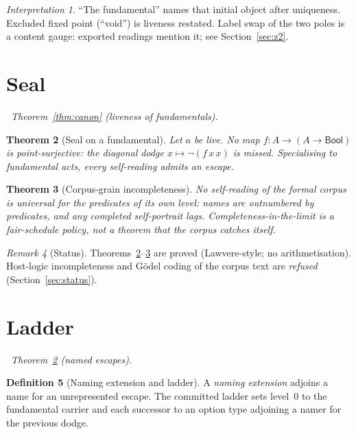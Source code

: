 \documentclass[11pt,a4paper]{article}
\theoremstyle{plain}
\newtheorem{theorem}{Theorem}[section]
\theoremstyle{definition}
\newtheorem{definition}[theorem]{Definition}
\theoremstyle{remark}
\newtheorem{remark}[theorem]{Remark}
\newtheorem{interpretation}[theorem]{Interpretation}
\newcommand{\Bool}{\mathsf{Bool}}
\newcommand{\dep}[1]{%
  \par\noindent{\small\color{muted}\sffamily Dependence:}~\textit{#1}\par\medskip}
\begin{document}
\begin{interpretation}
\label{int:fund}
``The fundamental'' names that initial object after uniqueness.
Excluded fixed point (``void'') is liveness restated. Label swap of the
two poles is a content gauge: exported readings mention it; see
Section~\ref{sec:z2}.
\end{interpretation}


\section{Seal}
\label{sec:seal}

\dep{Theorem~\ref{thm:canon} (liveness of fundamentals).}

\begin{theorem}[Seal on a fundamental]
\label{thm:seal}
Let $a$ be live. No map $f:A\to (A\to\Bool)$ is point-surjective: the
diagonal dodge $x\mapsto \neg(f\,x\,x)$ is missed. Specialising to
fundamental acts, every self-reading admits an escape.
\end{theorem}

\begin{theorem}[Corpus-grain incompleteness]
\label{thm:corpus}
No self-reading of the formal corpus is universal for the predicates of
its own level: names are outnumbered by predicates, and any completed
self-portrait lags. Completeness-in-the-limit is a fair-schedule
\emph{policy}, not a theorem that the corpus catches itself.
\end{theorem}

\begin{remark}[Status]
Theorems~\ref{thm:seal}--\ref{thm:corpus} are proved (Lawvere-style;
no arithmetisation). Host-logic incompleteness and G\"odel coding of the
corpus text are \emph{refused} (Section~\ref{sec:status}).
\end{remark}


\section{Ladder}
\label{sec:ladder}

\dep{Theorem~\ref{thm:seal} (named escapes).}

\begin{definition}[Naming extension and ladder]
\label{def:ladder}
A \emph{naming extension} adjoins a name for an unrepresented escape. The
committed ladder sets level~$0$ to the fundamental carrier and each
successor to an option type adjoining a namer for the previous dodge.
\end{definition}
\end{document}

